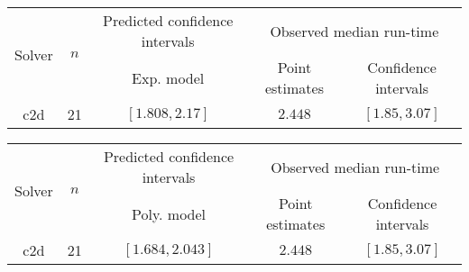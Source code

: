 \begin{tabular}{ccccc}
\hline 
\multirow{2}{*}{Solver} & \multirow{2}{*}{$n$} & Predicted confidence intervals & \multicolumn{2}{c}{Observed median  run-time}\tabularnewline
 &  & Exp. model  & Point estimates  & Confidence intervals\tabularnewline
\hline 
\hline 
\multirow{0}{*}{c2d} & 21 & $\mathbf{\left[1.808,2.17\right]}$ & $2.448$ & $\left[1.85,3.07\right]$ \tabularnewline 
\hline 
\end{tabular} 

\begin{tabular}{ccccc}
\hline 
\multirow{2}{*}{Solver} & \multirow{2}{*}{$n$} & Predicted confidence intervals & \multicolumn{2}{c}{Observed median  run-time}\tabularnewline
 &  & Poly. model  & Point estimates  & Confidence intervals\tabularnewline
\hline 
\hline 
\multirow{0}{*}{c2d} & 21 & $\mathbf{\left[1.684,2.043\right]}$ & $2.448$ & $\left[1.85,3.07\right]$ \tabularnewline 
\hline 
\end{tabular} 


